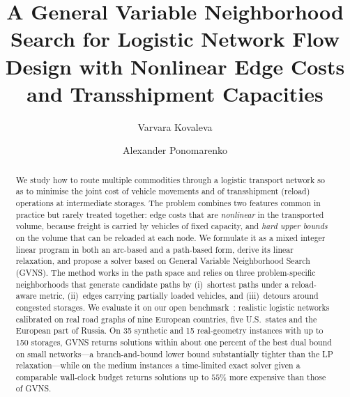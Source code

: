 \documentclass[runningheads]{llncs}
\begin{document}
\title{A General Variable Neighborhood Search for Logistic Network
Flow Design with Nonlinear Edge Costs and Transshipment Capacities}


\author{Varvara Kovaleva  \and Alexander Ponomarenko }

\maketitle

\begin{abstract}
We study how to route multiple commodities through a logistic transport network
so as to minimise the joint cost of vehicle movements and of transshipment
(reload) operations at intermediate storages. The problem combines
two features common in practice but rarely treated together: edge costs that are
\emph{nonlinear} in the transported volume, because freight is carried by
vehicles of fixed capacity, and \emph{hard upper bounds} on the volume that can
be reloaded at each node. We formulate it as a mixed integer linear program in
both an arc-based and a path-based form, derive its linear relaxation, and
propose a solver based on General Variable Neighborhood Search (GVNS). The method
works in the path space and relies on three problem-specific neighborhoods that
generate candidate paths by (i)~shortest paths under a reload-aware metric,
(ii)~edges carrying partially loaded vehicles, and (iii)~detours around congested
storages. We evaluate it on our open benchmark~\cite{benchmark}: realistic
logistic networks calibrated on real road graphs of nine European countries, five
U.S.\ states and the European part of Russia. On 35 synthetic and 15
real-geometry instances with up to 150 storages, GVNS returns solutions within
about one percent of the best dual bound on small networks---a branch-and-bound
lower bound substantially tighter than the LP relaxation---while on the medium
instances a time-limited exact solver given a comparable wall-clock budget returns
solutions up to $55\%$ more expensive than those of GVNS.

\end{abstract}
\end{document}
